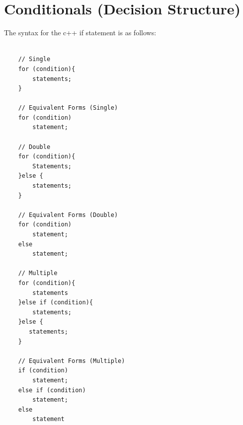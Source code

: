 \documentclass{report}
\begin{document}
    \section{\LARGE Conditionals (Decision Structure)}
    \bigbreak \noindent 
    The syntax for the c++ if statement is as follows:
    \smallbreak \noindent
    \sepline
    \begin{verbatim}

    // Single
    for (condition){
        statements;
    }

    // Equivalent Forms (Single)
    for (condition)
        statement;

    // Double
    for (condition){
        Statements;
    }else {
        statements;
    }

    // Equivalent Forms (Double)
    for (condition)
        statement;
    else 
        statement;

    // Multiple
    for (condition){
        statements
    }else if (condition){
        statements;
    }else {
       statements; 
    }

    // Equivalent Forms (Multiple)
    if (condition)
        statement;
    else if (condition)
        statement;
    else 
        statement

    \end{verbatim}
    \sepline

    \bigbreak \noindent 

    \pagebreak \bigbreak \noindent 
\end{document}

